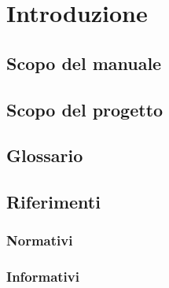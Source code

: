 \section{Introduzione}

\subsection{Scopo del manuale}

\subsection{Scopo del progetto}

\subsection{Glossario}

\subsection{Riferimenti}

\subsubsection{Normativi}

\subsubsection{Informativi}
